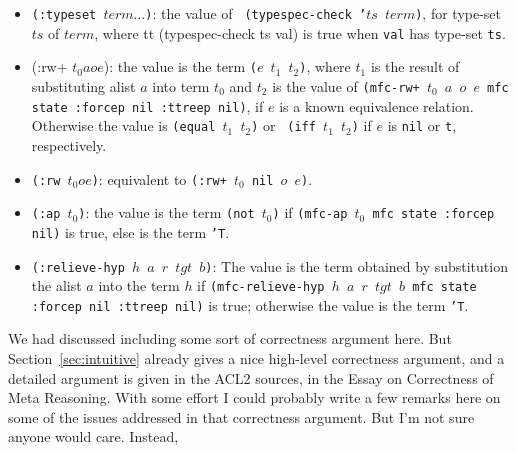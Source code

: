 \begin{itemize}

\item {\tt (:typeset $term \ldots$)}: the value of {\tt
    (typespec-check '$ts$ $term$)}, for type-set $ts$ of $term$, where
  {tt (typespec-check ts val)} is true when {\tt val} has type-set
  {\tt ts}.

\item {(:rw+ $t_0 a o e$)}: the value is the term {\tt ($e$ $t_1$
    $t_2$)}, where $t_1$ is the result of substituting alist $a$ into
  term $t_0$ and $t_2$ is the value of {\tt (mfc-rw+ $t_0$ $a$ $o$ $e$
    mfc state :forcep nil :ttreep nil)}, if $e$ is a known equivalence
  relation.  Otherwise the value is {\tt (equal $t_1$ $t_2$)} or {\tt
    (iff $t_1$ $t_2$)} if $e$ is {\tt nil} or {\tt t}, respectively.

\item {\tt (:rw $t_0 o e$)}: equivalent to {\tt (:rw+ $t_0$ nil $o$
    $e$)}.

\item {\tt (:ap $t_0$)}: the value is the term {\tt (not $t_0$)} if
  {\tt (mfc-ap $t_0$ mfc state :forcep nil)} is true, else is the term
  {\tt 'T}.

\item {\tt (:relieve-hyp $h$ $a$ $r$ $tgt$ $b$)}: The value is the
  term obtained by substitution the alist $a$ into the term $h$ if
  {\tt (mfc-relieve-hyp $h$ $a$ $r$ $tgt$ $b$ mfc state :forcep nil
    :ttreep nil)} is true; otherwise the value is the term {\tt 'T}.

\end{itemize}

\begin{mycomment}

  We had discussed including some sort of correctness argument here.
  But Section~\ref{sec:intuitive} already gives a nice high-level
  correctness argument, and a detailed argument is given in the ACL2
  sources, in the Essay on Correctness of Meta Reasoning.  With some
  effort I could probably write a few remarks here on some of the
  issues addressed in that correctness argument.  But I'm not sure
  anyone would care.  Instead,
\end{mycomment}
